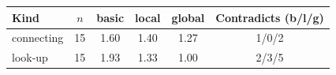 \begin{tabular}{lccccc}
\toprule
Kind & $n$ & basic & local & global & Contradicts (b/l/g) \\
\midrule
connecting & 15 & 1.60 & 1.40 & 1.27 & 1/0/2 \\
look-up & 15 & 1.93 & 1.33 & 1.00 & 2/3/5 \\
\bottomrule
\end{tabular}

